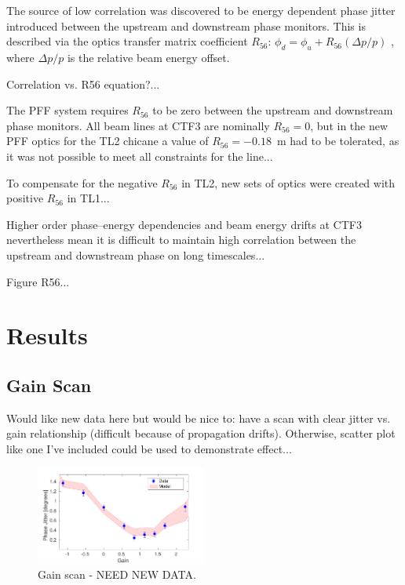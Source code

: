\documentclass[%
 reprint,
 amsmath,amssymb,
 aps,
]{revtex4-1}
\begin{document}
The source of low correlation was discovered to be energy dependent phase 
jitter introduced between the upstream and downstream phase monitors. This is 
described via the optics transfer matrix coefficient \(R_{56}\):
\(\phi_d = \phi_u + R_{56}(\Delta p / p)\)
, where \(\Delta p / p\) is the relative beam energy offset.

Correlation vs. R56 equation?...

The PFF system requires \(R_{56}\) to be zero between the upstream and 
downstream phase monitors. All beam lines at CTF3 are nominally \(R_{56}=0\), 
but in the new PFF optics for the TL2 chicane a value of \(R_{56}=-0.18\)~m had 
to be tolerated, as it was not possible to meet all constraints for the line...

To compensate for the negative \(R_{56}\) in TL2, new sets of optics were 
created with positive \(R_{56}\) in TL1...

Higher order phase--energy dependencies and beam energy drifts at CTF3 
nevertheless mean it is difficult to maintain high correlation between the 
upstream and downstream phase on long timescales...

Figure R56...

\section{\label{s:results}Results}

\subsection{\label{ss:gScan}Gain Scan}



Would like new data here but would be nice to: have a scan with clear jitter vs. gain relationship (difficult because of propagation drifts). Otherwise, scatter plot like one I've included could be used to demonstrate effect...

\begin{figure}
\includegraphics[width=0.5\textwidth]{figs/gScan}%
\caption{\label{fig:gScan}Gain scan - NEED NEW DATA.}
\end{figure}
\end{document}
